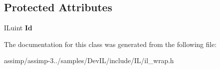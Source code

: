\subsection*{Protected Attributes}
\begin{DoxyCompactItemize}
\item 
\hypertarget{classil_image_aa996de45b5143a4ef96b5f25026e3551}{I\+Luint {\bfseries Id}}\label{classil_image_aa996de45b5143a4ef96b5f25026e3551}

\end{DoxyCompactItemize}


The documentation for this class was generated from the following file\+:\begin{DoxyCompactItemize}
\item 
assimp/assimp-\/3../samples/\+Dev\+I\+L/include/\+I\+L/il\+\_\+wrap.\+h\end{DoxyCompactItemize}
